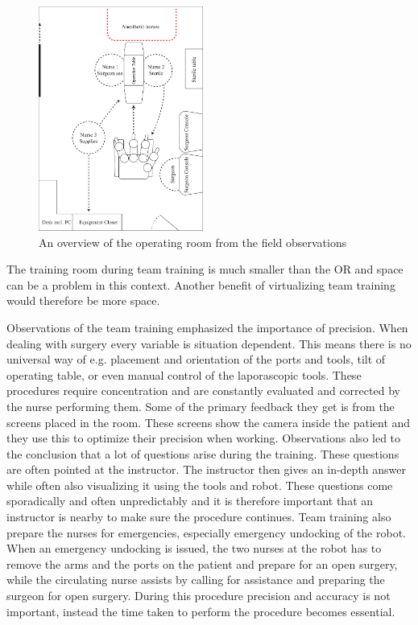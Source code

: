 \documentclass[conference]{IEEEtran}
\begin{document}
\begin{figure}[H]
 \centering
 \includegraphics[width=0.48\textwidth]{Figures/overview.pdf}
 \caption{An overview of the operating room from the field observations}
 \label{fig:overview}
 \end{figure}
 
 The training room during team training is much smaller than the OR and space can be a problem in this context. Another benefit of virtualizing team training would therefore be more space.

Observations of the team training emphasized the importance of precision. When dealing with surgery every variable is situation dependent. This means there is no universal way of e.g. placement and orientation of the ports and tools, tilt of operating table, or even manual control of the laporascopic tools. These procedures require concentration and are constantly evaluated and corrected by the nurse performing them. Some of the primary feedback they get is from the screens placed in the room. These screens show the camera inside the patient and they use this to optimize their precision when working. 
Observations also led to the conclusion that a lot of questions arise during the training. These questions are often pointed at the instructor. The instructor then gives an in-depth answer while often also visualizing it using the tools and robot. These questions come sporadically and often unpredictably and it is therefore important that an instructor is nearby to make sure the procedure continues. Team training also prepare the nurses for emergencies, especially emergency undocking of the robot. When an emergency undocking is issued, the two nurses at the robot has to remove the arms and the ports on the patient and prepare for an open surgery, while the circulating nurse assists by calling for assistance and preparing the surgeon for open surgery. During this procedure precision and accuracy is not important, instead the time taken to perform the procedure becomes essential. 
\end{document}
